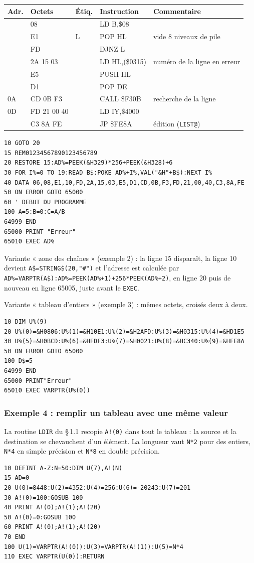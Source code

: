 \documentclass[a4paper,10pt]{article}
\makeatletter
\newenvironment{asm}
  {\small\begin{longtable}{@{}>{\ttfamily}l>{\ttfamily}l>{\ttfamily}l>{\ttfamily}l>{\raggedright\arraybackslash}p{6.2cm}@{}}
   \toprule
   \normalfont\bfseries Adr. & \normalfont\bfseries Octets & \normalfont\bfseries Étiq. & \normalfont\bfseries Instruction & \textbf{Commentaire}\\
   \midrule\endhead
   \bottomrule\endfoot}
  {\end{longtable}}
\makeatother
\begin{document}
\begin{asm}
00 & 06 08    & & LD B,\$08     & \\
02 & E1       & L & POP HL      & vide 8 niveaux de pile \\
03 & 10 FD    & & DJNZ L        & \\
05 & 2A 15 03 & & LD HL,(\$0315) & numéro de la ligne en erreur \\
08 & E5       & & PUSH HL       & \\
09 & D1       & & POP DE        & \\
0A & CD 0B F3 & & CALL \$F30B   & recherche de la ligne \\
0D & FD 21 00 40 & & LD IY,\$4000 & \\
11 & C3 8A FE & & JP \$FE8A     & édition (\texttt{LIST@}) \\
\end{asm}

\begin{verbatim}
10 GOTO 20
15 REM01234567890123456789
20 RESTORE 15:AD%=PEEK(&H329)*256+PEEK(&H328)+6
30 FOR I%=0 TO 19:READ B$:POKE AD%+I%,VAL("&H"+B$):NEXT I%
40 DATA 06,08,E1,10,FD,2A,15,03,E5,D1,CD,0B,F3,FD,21,00,40,C3,8A,FE
50 ON ERROR GOTO 65000
60 ' DEBUT DU PROGRAMME
100 A=5:B=0:C=A/B
64999 END
65000 PRINT "Erreur"
65010 EXEC AD%
\end{verbatim}
Variante « zone des chaînes » (exemple 2) : la ligne 15 disparaît, la ligne 10
devient \texttt{A\$=STRING\$(20,"\#")} et l'adresse est calculée par
\texttt{AD\%=VARPTR(A\$):AD\%=PEEK(AD\%+1)+256*PEEK(AD\%+2)}, en ligne 20
puis de nouveau en ligne 65005, juste avant le \texttt{EXEC}.

Variante « tableau d'entiers » (exemple 3) : mêmes octets, croisés deux à deux.
\begin{verbatim}
10 DIM U%(9)
20 U%(0)=&H0806:U%(1)=&H10E1:U%(2)=&H2AFD:U%(3)=&H0315:U%(4)=&HD1E5
30 U%(5)=&H0BCD:U%(6)=&HFDF3:U%(7)=&H0021:U%(8)=&HC340:U%(9)=&HFE8A
50 ON ERROR GOTO 65000
100 D$=5
64999 END
65000 PRINT"Erreur"
65010 EXEC VARPTR(U%(0))
\end{verbatim}

\subsubsection*{Exemple 4 : remplir un tableau avec une même valeur}
La routine \texttt{LDIR} du §\,1.1 recopie \texttt{A!(0)} dans tout le
tableau : la source et la destination se chevauchent d'un élément. La
longueur vaut \texttt{N*2} pour des entiers, \texttt{N*4} en simple
précision et \texttt{N*8} en double précision.
\begin{verbatim}
10 DEFINT A-Z:N=50:DIM U(7),A!(N)
15 AD=0
20 U(0)=8448:U(2)=4352:U(4)=256:U(6)=-20243:U(7)=201
30 A!(0)=100:GOSUB 100
40 PRINT A!(0);A!(1);A!(20)
50 A!(0)=0:GOSUB 100
60 PRINT A!(0);A!(1);A!(20)
70 END
100 U(1)=VARPTR(A!(0)):U(3)=VARPTR(A!(1)):U(5)=N*4
110 EXEC VARPTR(U(0)):RETURN
\end{verbatim}
\end{document}
